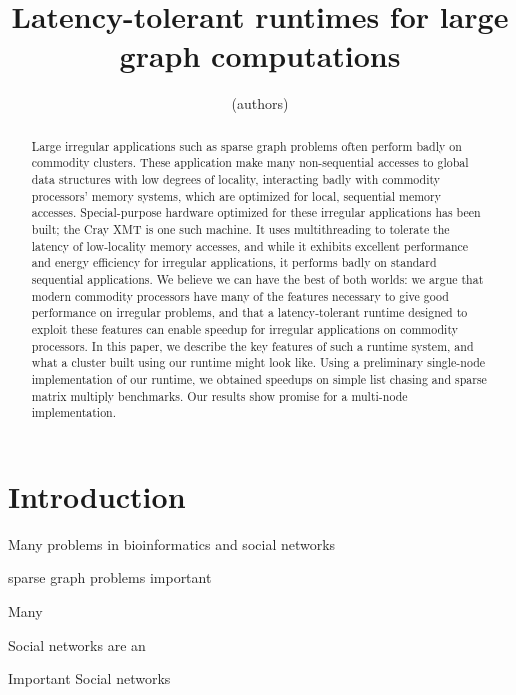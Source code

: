 \documentclass{acm_proc_article-sp}
\begin{document}
\title{Latency-tolerant runtimes for large graph computations}

\author{
(authors)
}

\maketitle
\begin{abstract}

  Large irregular applications such as sparse graph problems often
  perform badly on commodity clusters. These application make many
  non-sequential accesses to global data structures with low degrees of
  locality, interacting badly with commodity processors' memory
  systems, which are optimized for local, sequential memory
  accesses. Special-purpose hardware optimized for these irregular
  applications has been built; the Cray XMT is one such machine. It
  uses multithreading to tolerate the latency of low-locality memory
  accesses, and while it exhibits excellent performance and energy
  efficiency for irregular applications, it performs badly on standard
  sequential applications. We believe we can have the best of both
  worlds: we argue that modern commodity processors have many of the
  features necessary to give good performance on irregular problems,
  and that a latency-tolerant runtime designed to exploit these
  features can enable speedup for irregular applications on commodity
  processors. In this paper, we describe the key features of such a
  runtime system, and what a cluster built using our runtime might
  look like. Using a preliminary single-node implementation of our
  runtime, we obtained speedups on simple list chasing and sparse
  matrix multiply benchmarks. Our results show promise for a
  multi-node implementation.

\end{abstract}

\section{Introduction}


Many problems in bioinformatics and social networks 







sparse graph problems important

Many 


Social networks are an 

Important 
Social networks
\end{document}
